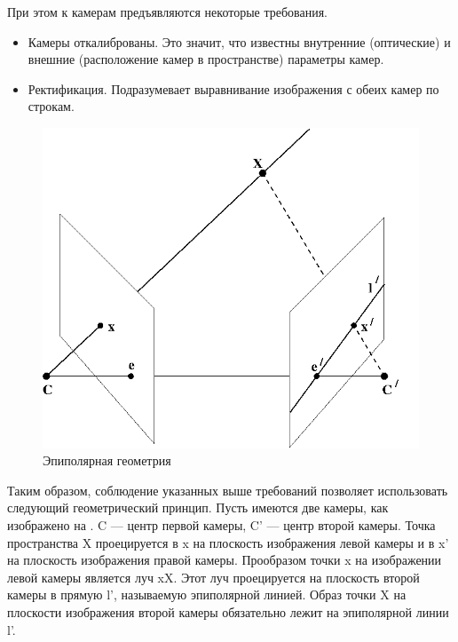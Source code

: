 При этом к камерам предъявляются некоторые требования.
\begin{itemize}
	\item Камеры откалиброваны. Это значит, что известны внутренние (оптические) и внешние (расположение камер в пространстве) параметры камер. 
	\item Ректификация. Подразумевает выравнивание изображения с обеих камер по строкам.  %
\end{itemize}

\begin{figure}[H]
	\begin{center}
		\includegraphics[scale=0.7]{pics/epipolar geometry.png}
		\caption{Эпиполярная геометрия} 
		\label{pic:epipol} %
	\end{center}
\end{figure}

Таким образом, соблюдение указанных выше требований позволяет использовать следующий геометрический принцип. Пусть имеются две камеры, как изображено 
на \cite{pic:epipol}. C — центр первой камеры, C' — центр второй камеры. Точка пространства X 
проецируется в x на плоскость изображения левой камеры и в x' на плоскость изображения правой камеры. Прообразом точки x на изображении левой 
камеры является луч xX. Этот луч проецируется на плоскость второй камеры в прямую l', называемую эпиполярной линией. Образ точки X на плоскости 
изображения второй камеры обязательно лежит на эпиполярной линии l'.


